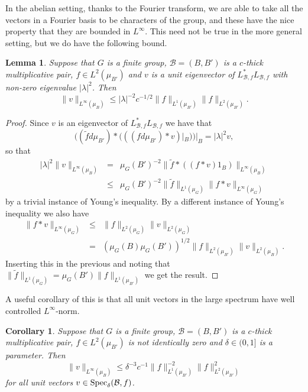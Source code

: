 \documentclass[12pt]{amsart}
\numberwithin{equation}{section}
\theoremstyle{plain}
\newtheorem{lemma}[subsection]{Lemma}
\newtheorem{corollary}[subsection]{Corollary}
\theoremstyle{definition}
\renewcommand{\leq}{\leqslant}
\providecommand{\Spec}{\mathop{\rm Spec}\nolimits}
\begin{document}
In the abelian setting, thanks to the Fourier transform, we are able to take all the vectors in a Fourier basis to be characters of the group, and these have the nice property that they are bounded in $L^\infty$.  This need not be true in the more general setting, but we do have the following bound.
\begin{lemma}\label{lem.evalbd}
Suppose that $G$ is a finite group, $\mathcal{B}=(B,B')$ is a $c$-thick multiplicative pair, $f \in L^2(\mu_{B'})$ and $v$ is a unit eigenvector of $L_{\mathcal{B},f}^*L_{\mathcal{B},f}$ with non-zero eigenvalue $|\lambda|^2$. Then
\begin{equation*}
\|v\|_{L^\infty(\mu_{B})} \leq |\lambda|^{-2}c^{-1/2}\|f\|_{L^1(\mu_{B'})}\|f\|_{L^2(\mu_{B'})}.
\end{equation*}
\end{lemma}
\begin{proof}
Since $v$ is an eigenvector of $L_{\mathcal{B},f}^*L_{\mathcal{B},f}$ we have that
\begin{equation*}
((\tilde{f}d\mu_{B'})\ast (((fd\mu_{B'}) \ast v)|_B))|_B = |\lambda|^2 v,
\end{equation*}
so that
\begin{eqnarray*}
|\lambda|^2 \|v\|_{L^\infty(\mu_B)} & =& \mu_G(B')^{-2}\| \tilde{f}\ast((f\ast v)1_B)\|_{L^\infty(\mu_B)} \\ &\leq & \mu_G(B')^{-2}\|\tilde{f}\|_{L^1(\mu_G)}\| f\ast v\|_{L^\infty(\mu_G)}
\end{eqnarray*}
by a trivial instance of Young's inequality.  By a different instance of Young's inequality we also have
\begin{eqnarray*}
\| f\ast v\|_{L^\infty(\mu_G)}& \leq &\|f\|_{L^2(\mu_G)}\|v\|_{L^2(\mu_G)}\\& = &(\mu_G(B)\mu_G(B'))^{1/2}\|f\|_{L^2(\mu_{B'})}\|v\|_{L^2(\mu_B)}.
\end{eqnarray*}
Inserting this in the previous and noting that $\|\tilde{f}\|_{L^1(\mu_G)} = \mu_G(B')\|f\|_{L^1(\mu_{B'})}$ we get the result.
\end{proof}
A useful corollary of this is that all unit vectors in the large spectrum have well controlled $L^\infty$-norm.
\begin{corollary}
\label{cor.genl8bd}
Suppose that $G$ is a finite group, $\mathcal{B}=(B,B')$ is a $c$-thick multiplicative pair, $f \in L^2(\mu_{B'})$ is not identically zero and $\delta\in (0,1]$ is a parameter. Then
\begin{equation*}
\|v\|_{L^\infty(\mu_{B})} \leq \delta^{-3}c^{-1}\|f\|_{L^1(\mu_{B'})}^{-2}\|f\|_{L^2(\mu_{B'})}^2
\end{equation*}
for all unit vectors $v \in \Spec_\delta(\mathcal{B},f)$.
\end{corollary}
\end{document}

